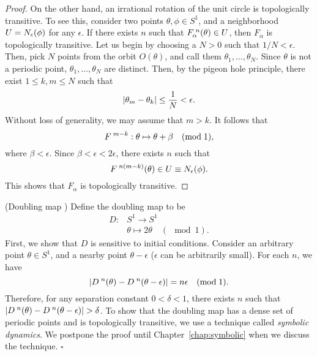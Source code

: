 \documentclass[10pt,draft,twoside]{book}
\begin{document}
\begin{example}
\begin{proposition}
\begin{proof}
      On the other hand, an irrational rotation of the unit circle is topologically transitive.
      To see this, consider two points $\theta, \phi \in S^1$, and a neighborhood $U = N_{\epsilon}(\phi)$ for any $\epsilon$.
      If there exists $n$ such that $F_\alpha^{\;n}(\theta) \in U$, then $F_\alpha$ is topologically transitive.
      Let us begin by choosing a $N > 0$ such that $1/N < \epsilon$.
      Then, pick $N$ points from the orbit $O(\theta)$, and call them $\theta_1, \ldots, \theta_N$.
      Since $\theta$ is not a periodic point, $\theta_1, \ldots, \theta_N$ are distinct.
      Then, by the pigeon hole principle, there exist $1 \leq k,m \leq N$ such that
      \begin{equation*}
        \left |  \theta_m - \theta_k  \right | \leq \frac{1}{N} < \epsilon.
      \end{equation*}
      Without loss of generality, we may assume that $m > k$.
      It follows that 
      \begin{equation*}
        F^{\;m - k}: \theta \mapsto \theta + \beta \quad(\mathrm{mod}\; \mathrm{1}),
      \end{equation*}
      where $\beta < \epsilon$.
      Since $\beta < \epsilon < 2\epsilon$, there exists $n$ such that
      \begin{equation*}
        F^{\;n(m-k)}(\theta) \in U \equiv N_{\epsilon}(\phi).
      \end{equation*}
      This shows that $F_\alpha$ is topologically transitive.
    \end{proof}
  \end{proposition}
\end{example}
\begin{example}
  (Doubling map \citep{devaney})
  Define the doubling map to be 
  \begin{align*}
    D: &S^1 \to S^1  \\
    &\theta \mapsto 2\theta \quad(\mod{1}).
  \end{align*}
  First, we show that $D$ is sensitive to initial conditions. 
  Consider an arbitrary point $\theta \in S^1$, and a nearby point $\theta - \epsilon$ ($\epsilon$ can be arbitrarily small).
  For each $n$, we have
  \begin{equation*}
    \left |  D^{\;n}(\theta) - D^{\;n}(\theta - \epsilon)  \right | 
    = 
    n\epsilon \quad(\mathrm{mod}\; \mathrm{1}).
  \end{equation*}
  Therefore, for any separation constant $0 < \delta < 1$, there exists $n$ such that $\left |  D^{\;n}(\theta) - D^{\;n}(\theta - \epsilon)  \right | > \delta$.
  To show that the doubling map has a dense set of periodic points and is topologically transitive, we use a technique called \textit{symbolic dynamics}.
  We postpone the proof until Chapter~\ref{chap:symbolic} when we discuss the technique.
  $\square$
\end{example}
\end{document}
